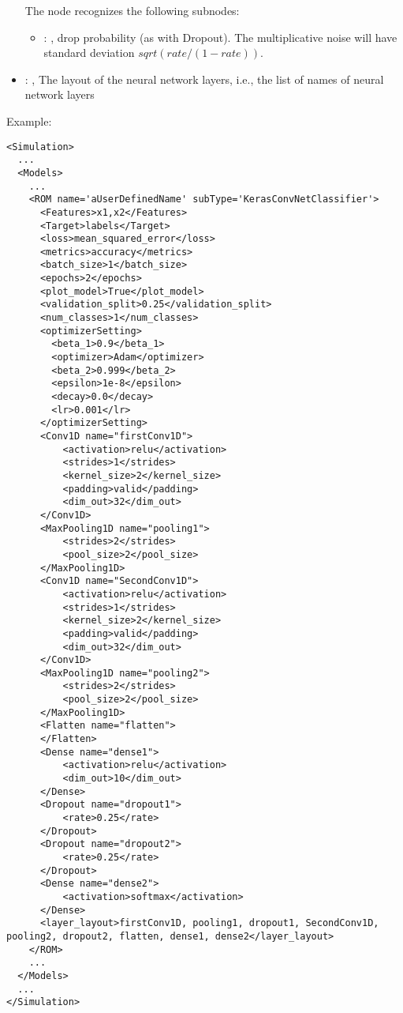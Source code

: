 \begin{itemize}
      The  node recognizes the following subnodes:
      \begin{itemize}
        \item {}: , 
          drop probability (as with Dropout). The multiplicative noise will have standard deviation
          $sqrt(rate / (1 - rate))$.
      \end{itemize}

    \item {}: , 
      The layout of the neural network layers, i.e., the list of names of neural network layers
  \end{itemize}

\hspace{24pt}
Example:
\begin{lstlisting}[style=XML,morekeywords={name,subType}]
<Simulation>
  ...
  <Models>
    ...
    <ROM name='aUserDefinedName' subType='KerasConvNetClassifier'>
      <Features>x1,x2</Features>
      <Target>labels</Target>
      <loss>mean_squared_error</loss>
      <metrics>accuracy</metrics>
      <batch_size>1</batch_size>
      <epochs>2</epochs>
      <plot_model>True</plot_model>
      <validation_split>0.25</validation_split>
      <num_classes>1</num_classes>
      <optimizerSetting>
        <beta_1>0.9</beta_1>
        <optimizer>Adam</optimizer>
        <beta_2>0.999</beta_2>
        <epsilon>1e-8</epsilon>
        <decay>0.0</decay>
        <lr>0.001</lr>
      </optimizerSetting>
      <Conv1D name="firstConv1D">
          <activation>relu</activation>
          <strides>1</strides>
          <kernel_size>2</kernel_size>
          <padding>valid</padding>
          <dim_out>32</dim_out>
      </Conv1D>
      <MaxPooling1D name="pooling1">
          <strides>2</strides>
          <pool_size>2</pool_size>
      </MaxPooling1D>
      <Conv1D name="SecondConv1D">
          <activation>relu</activation>
          <strides>1</strides>
          <kernel_size>2</kernel_size>
          <padding>valid</padding>
          <dim_out>32</dim_out>
      </Conv1D>
      <MaxPooling1D name="pooling2">
          <strides>2</strides>
          <pool_size>2</pool_size>
      </MaxPooling1D>
      <Flatten name="flatten">
      </Flatten>
      <Dense name="dense1">
          <activation>relu</activation>
          <dim_out>10</dim_out>
      </Dense>
      <Dropout name="dropout1">
          <rate>0.25</rate>
      </Dropout>
      <Dropout name="dropout2">
          <rate>0.25</rate>
      </Dropout>
      <Dense name="dense2">
          <activation>softmax</activation>
      </Dense>
      <layer_layout>firstConv1D, pooling1, dropout1, SecondConv1D, pooling2, dropout2, flatten, dense1, dense2</layer_layout>
    </ROM>
    ...
  </Models>
  ...
</Simulation>
\end{lstlisting}
